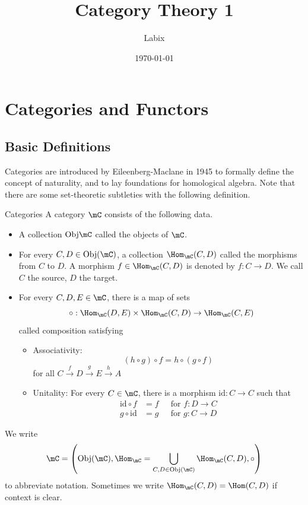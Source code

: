 \documentclass[a4paper]{article}
\title{Category Theory 1}
\author{Labix}
\date{\today}
\begin{document}
\maketitle
\begin{abstract}
\end{abstract}
\pagebreak
\tableofcontents
\pagebreak

\section{Categories and Functors}
\subsection{Basic Definitions}
Categories are introduced by Eileenberg-Maclane in 1945 to formally define the concept of naturality, and to lay foundations for homological algebra. Note that there are some set-theoretic subtleties with the following definition. 

\begin{defn}{Categories}{} A category $\mC$ consists of the following data. 
\begin{itemize}
\item A collection $\text{Obj}\mC$ called the objects of $\mC$. 
\item For every $C,D\in\text{Obj}(\mC)$, a collection $\Hom_\mC(C,D)$ called the morphisms from $C$ to $D$. A morphism $f\in\Hom_\mC(C,D)$ is denoted by $f:C\to D$. We call $C$ the source, $D$ the target. 
\item For every $C,D,E\in\mC$, there is a map of sets $$\circ:\Hom_\mC(D,E)\times\Hom_\mC(C,D)\to\Hom_\mC(C,E)$$ called composition satisfying
\begin{itemize}
\item Associativity: $$(h\circ g)\circ f=h\circ(g\circ f)$$ for all $C\overset{f}{\rightarrow}D\overset{g}{\rightarrow}E\overset{h}{\rightarrow}A$
\item Unitality: For every $C\in\mC$, there is a morphism $\text{id}:C\to C$ such that 
\begin{align*}
\text{id}\circ f&=f\;\;\;\;\text{ for }f:D\to C\\
g\circ\text{id}&=g\;\;\;\;\text{ for }g:C\to D
\end{align*}
\end{itemize}
\end{itemize}
\end{defn}

We write $$\mC=\left(\text{Obj}(\mC),\Hom_\mC=\bigcup_{C,D\in\text{Obj}(\mC)}\Hom_\mC(C,D),\circ\right)$$ to abbreviate notation. Sometimes we write $\Hom_\mC(C,D)=\Hom(C,D)$ if context is clear. 
\end{document}
